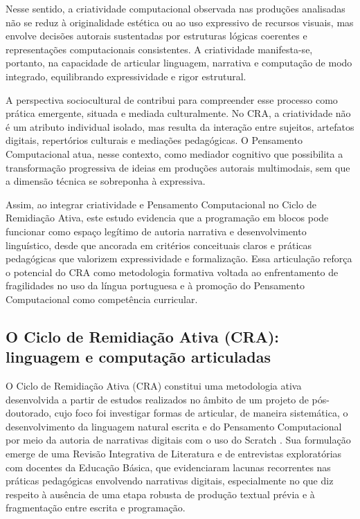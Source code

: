 \documentclass[portuguese]{textolivre}
\begin{document}
Nesse sentido, a criatividade computacional observada nas produções analisadas não se reduz à originalidade estética ou ao uso expressivo de recursos visuais, mas envolve decisões autorais sustentadas por estruturas lógicas coerentes e representações computacionais consistentes. A criatividade manifesta-se, portanto, na capacidade de articular linguagem, narrativa e computação de modo integrado, equilibrando expressividade e rigor estrutural.

A perspectiva sociocultural de \textcite{sawyer2004} contribui para compreender esse processo como prática emergente, situada e mediada culturalmente. No CRA, a criatividade não é um atributo individual isolado, mas resulta da interação entre sujeitos, artefatos digitais, repertórios culturais e mediações pedagógicas. O Pensamento Computacional atua, nesse contexto, como mediador cognitivo que possibilita a transformação progressiva de ideias em produções autorais multimodais, sem que a dimensão técnica se sobreponha à expressiva.

Assim, ao integrar criatividade e Pensamento Computacional no Ciclo de Remidiação Ativa, este estudo evidencia que a programação em blocos pode funcionar como espaço legítimo de autoria narrativa e desenvolvimento linguístico, desde que ancorada em critérios conceituais claros e práticas pedagógicas que valorizem expressividade e formalização. Essa articulação reforça o potencial do CRA como metodologia formativa voltada ao enfrentamento de fragilidades no uso da língua portuguesa e à promoção do Pensamento Computacional como competência curricular.


\subsection{O Ciclo de Remidiação Ativa (CRA): linguagem e computação articuladas}

O Ciclo de Remidiação Ativa (CRA) constitui uma metodologia ativa desenvolvida a partir de estudos realizados no âmbito de um projeto de pós-doutorado, cujo foco foi investigar formas de articular, de maneira sistemática, o desenvolvimento da linguagem natural escrita e do Pensamento Computacional por meio da autoria de narrativas digitais com o uso do Scratch \cite{foohs2022}. Sua formulação emerge de uma Revisão Integrativa de Literatura e de entrevistas exploratórias com docentes da Educação Básica, que evidenciaram lacunas recorrentes nas práticas pedagógicas envolvendo narrativas digitais, especialmente no que diz respeito à ausência de uma etapa robusta de produção textual prévia e à fragmentação entre escrita e programação.
\end{document}
